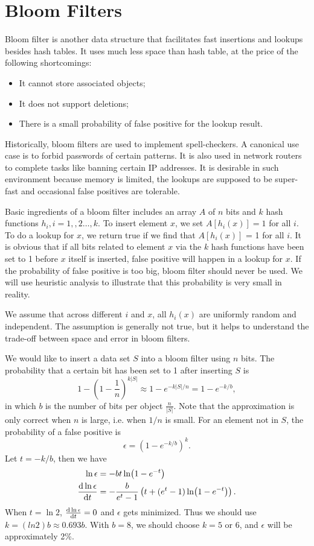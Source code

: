 \section{Bloom Filters}
Bloom filter is another data structure that facilitates fast insertions and lookups besides hash tables. It uses much less space than hash table, at the price of the following shortcomings:
\begin{itemize}
\item It cannot store associated objects;
\item It does not support deletions;
\item There is a small probability of false positive for the lookup result.
\end{itemize} 
Historically, bloom filters are used to implement spell-checkers. A canonical use case is to forbid passwords of certain patterns. It is also used in network routers to complete tasks like banning certain IP addresses. It is desirable in such  environment because memory is limited, the lookups are supposed to be super-fast and occasional false positives are tolerable. 

Basic ingredients of a bloom filter includes an array $A$ of $n$ bits and $k$ hash functions $h_i,i=1,,2\dots,k$. To insert element $x$, we set $A[h_i(x)] = 1$ for all $i$. To do a lookup for $x$, we return true if we find that $A[h_i(x)]$ = 1 for all $i$. It is obvious that if all bits related to element $x$ via the $k$ hash functions have been set to 1 before $x$ itself is inserted, false positive will happen in a lookup for $x$. If the probability of false positive is too big, bloom filter should never be used. We will use heuristic analysis to illustrate that this probability is very small in reality.

We assume that across different $i$ and $x$, all $h_i(x)$ are uniformly random and independent. The assumption is generally not true, but it helps to understand the trade-off between space and error in bloom filters. 

We would like to insert a data set $S$ into a bloom filter using $n$ bits. The probability that a certain bit has been set to 1 after inserting $S$ is
\begin{equation}\label{bloomfilterheuristic}
1- \left(1-\frac{1}{n}\right)^{k\lvert S\rvert}\approx 1-e^{-k\lvert S\rvert/n}=1-e^{-k/b},
\end{equation}
in which $b$ is the number of bits per object $\frac{n}{\lvert S\rvert}.$ Note that the approximation is only correct when $n$ is large, i.e. when $1/n$ is small. For an element not in $S$, the probability of a false positive is 
\begin{equation*}
\epsilon=\left(1-e^{-k/b}\right)^k.
\end{equation*}
Let $t=-k/b$, then we have
\begin{align*}
\ln\epsilon&=-bt\ln(1-e^{-t})\\
\dv{\ln\epsilon}{t}&=-\frac{b}{e^t-1}\left(t+(e^t-1)\ln(1-e^{-t})\right).\\
\end{align*}
When $t=\ln 2$, $\dv{\ln\epsilon}{t}=0$ and $\epsilon$ gets minimized. Thus we should use $k=(ln 2)b\approx 0.693b.$ With $b=8$, we should choose $k=5$ or 6, and $\epsilon$ will be approximately 2\%. 

